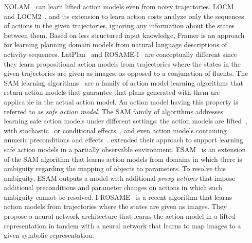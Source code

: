 \documentclass{article}
\theoremstyle{definition}
\theoremstyle{remark}
\newcommand{\sam}{\ac{SAM}\xspace}
\begin{document}
NOLAM~\citep{Lamanna24} can learn lifted action models even from noisy trajectories. 
LOCM~\citep{cresswell2011generalised} and LOCM2~\citep{cresswell2013acquiring}, and its extension to learn action costs \citep{gregory2016domain} analyze only the sequences of actions in the given trajectories, ignoring any information about the states between them. Based on less structured input knowledge, Framer \citep{lindsay2017framer} is an approach for learning planning domain models from natural language descriptions of activity sequences.
LatPlan~\citep{asai2018classical} and ROSAME-I~\citep{xi2024neuro} are conceptually different since they learn propositional action models from trajectories where the states in the given trajectories are given as images, as opposed to a conjunction of fluents. 
The \sam learning algorithms~\citep{stern2017efficientAndSafe,mordoch2023learning,juba2021safe,juba2022learning,le2024learning,mordoch2024safe} are a family of action model learning algorithms that return action models that guarantee that plans generated with them are applicable in the actual action model. 
An action model having this property is referred to as \emph{safe action model}.
The \sam family of algorithms addresses learning safe action models under different settings: 
the action models are lifted~\citep{juba2021safe}, with stochastic~\citep{juba2022learning} or conditional effects~\citep{mordoch2024safe}, and even action models containing numeric preconditions and effects~\citep{mordoch2023learning}.
\citet{le2024learning} extended their approach to support learning safe action models in a partially observable environment. 
ESAM~\citep{juba2021safe} is an extension of the \sam algorithm that learns action models from domains in which there is ambiguity regarding the mapping of objects to parameters. To resolve this ambiguity, ESAM outputs a model with additional \emph{proxy actions} that impose additional preconditions and parameter changes on actions in which such ambiguity cannot be resolved. 
I-ROSAME~\citep{xi2024neuro} is a recent algorithm that learns action models from trajectories where the states are given as images. 
They propose a neural network architecture that learns the action model in a lifted representation in tandem with a neural network that learns to map images to a given symbolic representation. 
\end{document}
